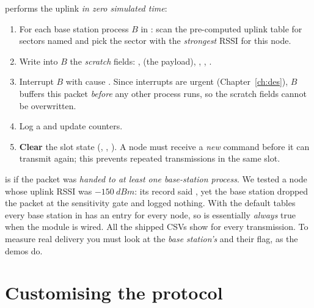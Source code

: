  performs the uplink \emph{in zero simulated time}:
\begin{enumerate}
 \item For each base station process $B$ in : scan the pre-computed uplink table  for sectors named  and pick the sector with the \emph{strongest} RSSI for this node.
 \item Write into $B$ the \emph{scratch} fields: ,  (the payload), , , .
 \item Interrupt $B$ with cause . Since interrupts are urgent (Chapter~\ref{ch:des}), $B$ buffers this packet \emph{before} any other process runs, so the scratch fields cannot be overwritten.
 \item Log a  and update counters.
 \item \textbf{Clear} the slot state (, , ). A node must receive a \emph{new} command before it can transmit again; this prevents repeated transmissions in the same slot.
\end{enumerate}

\begin{reality}
 is  if the packet was \emph{handed to at least one base-station process}. We tested a node whose uplink RSSI was $\SI{-150}{dBm}$: its record said , yet the base station dropped the packet at the sensitivity gate and logged nothing. With the default tables every base station in  has an entry for every node, so  is essentially \emph{always} true when the module is wired. All the shipped CSVs show  for every transmission. To measure real delivery you must look at the \emph{base station's}  and their  flag, as the demos do.
\end{reality}

\section{Customising the protocol}
\label{sec:override}

